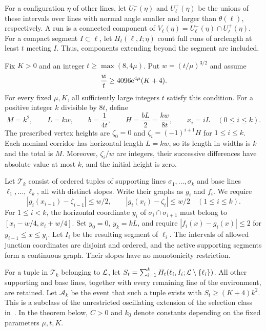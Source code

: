 \documentclass[11pt,letterpaper]{article}
\begin{document}
For a configuration $\eta$ of other lines, let $U_\ell^-(\eta)$ and $U_\ell^+(\eta)$ be the unions of these intervals over lines with normal angle smaller and larger than $\theta(\ell)$, respectively. A run is a connected component of $V_\ell(\eta)=U_\ell^-(\eta)\cap U_\ell^+(\eta)$. For a compact segment $I\subset\ell$, let $H_t(\ell,I;\eta)$ count full runs of arclength at least $t$ meeting $I$. Thus, components extending beyond the segment are included.

Fix $K>0$ and an integer $t\ge\max(8,4\mu)$. Put $w=(t/\mu)^{3/2}$ and assume
\begin{equation}\label{eq:scale}
 \frac wt\ge4096\mathrm{e}^{4\mu}(K+4).
\end{equation}
For every fixed $\mu,K$, all sufficiently large integers $t$ satisfy this condition. For a positive integer $k$ divisible by $8t$, define
\[
 M=k^2,\qquad L=kw,\qquad b=\frac1{4t},\qquad
 H=\frac{bL}{2}=\frac{kw}{8t},\qquad x_i=iL\quad(0\le i\le k).
\]
The prescribed vertex heights are $\zeta_0=0$ and $\zeta_i=(-1)^{i+1}H$ for $1\le i\le k$. Each nominal corridor has horizontal length $L=kw$, so its length in widths is $k$ and the total is $M$. Moreover, $\zeta_i/w$ are integers, their successive differences have absolute value at most $k$, and the initial height is zero.

Let $\mathcal T_k$ consist of ordered tuples of supporting lines $\sigma_1,\ldots,\sigma_k$ and base lines $\ell_1,\ldots,\ell_k$, all with distinct slopes. Write their graphs as $g_i$ and $f_i$. We require
\begin{equation}\label{eq:anchors}
 |g_i(x_{i-1})-\zeta_{i-1}|\le w/2,\qquad
 |g_i(x_i)-\zeta_i|\le w/2\quad(1\le i\le k).
\end{equation}
For $1\le i<k$, the horizontal coordinate $y_i$ of $\sigma_i\cap\sigma_{i+1}$ must belong to $[x_i-w/4,x_i+w/4]$. Set $y_0=0$, $y_k=kL$, and require $|f_i(x)-g_i(x)|\le2$ for $y_{i-1}\le x\le y_i$. Let $I_i$ be the resulting segment of $\ell_i$. The intervals of allowed junction coordinates are disjoint and ordered, and the active supporting segments form a continuous graph. Their slopes have no monotonicity restriction.

For a tuple in $\mathcal T_k$ belonging to $\mathcal L$, let $S_t=\sum_{i=1}^kH_t(\ell_i,I_i;\mathcal L\setminus\{\ell_i\})$. All other supporting and base lines, together with every remaining line of the environment, are retained. Let $\mathcal A_k$ be the event that such a tuple exists with $S_t\ge(K+4)k^2$. This is a subclass of the unrestricted oscillating extension of the selection class in~\cite{CS26}. In the theorem below, $C>0$ and $k_0$ denote constants depending on the fixed parameters $\mu,t,K$.
\end{document}
